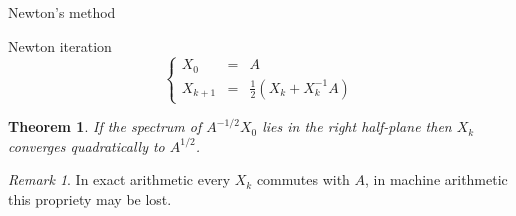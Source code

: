 \documentclass{beamer}
\newcounter{counter1}
\theoremstyle{plain}
\newtheorem{myteo}[counter1]{Theorem}
\theoremstyle{definition}
\theoremstyle{remark}
\newtheorem{myoss}[counter1]{Remark}
\newcommand{\pa}[1]{\left(#1\right)}
\newcommand{\norm}[1]{\left\|#1\right\|}
\DeclareMathOperator{\sign}{sign}
\begin{document}
\begin{frame}{Newton's method}
  \begin{block}{Newton iteration}
    \[ \left\{
        \begin{matrix}
          X_0 &=& A \\
          X_{k+1} &=& \frac{1}{2} \pa{ X_k + X_k ^{-1} A}
        \end{matrix} \right.
    \]
  \end{block}

  \begin{myteo}
    If the spectrum  of $A^{-1/2} X_0$ lies in the right half-plane
    then $X_k$ converges quadratically to $A^{1/2}$.
  \end{myteo}
  \begin{myoss}
    In exact arithmetic every $X_k$ commutes with $A$, in machine
    arithmetic this propriety may be lost.
  \end{myoss}
\end{frame}




  
\end{document}

